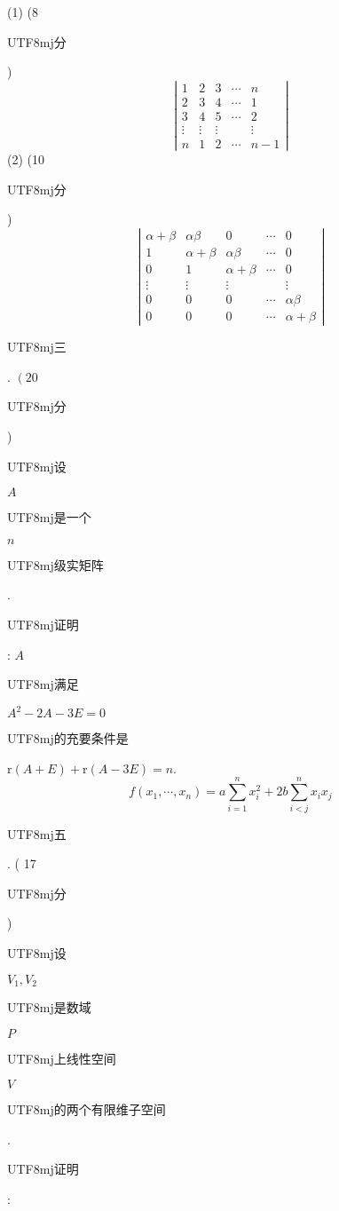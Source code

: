 \documentclass[10pt]{article}
\begin{document}
(1) (8 \begin{CJK}{UTF8}{mj}分\end{CJK})
$$
\left|\begin{array}{ccccc}
1 & 2 & 3 & \cdots & n \\
2 & 3 & 4 & \cdots & 1 \\
3 & 4 & 5 & \cdots & 2 \\
\vdots & \vdots & \vdots & & \vdots \\
n & 1 & 2 & \cdots & n-1
\end{array}\right|
$$
(2) (10 \begin{CJK}{UTF8}{mj}分\end{CJK})
$$
\left|\begin{array}{ccccc}
\alpha+\beta & \alpha \beta & 0 & \cdots & 0 \\
1 & \alpha+\beta & \alpha \beta & \cdots & 0 \\
0 & 1 & \alpha+\beta & \cdots & 0 \\
\vdots & \vdots & \vdots & & \vdots \\
0 & 0 & 0 & \cdots & \alpha \beta \\
0 & 0 & 0 & \cdots & \alpha+\beta
\end{array}\right|
$$
\begin{CJK}{UTF8}{mj}三\end{CJK}. $\left(20\right.$ \begin{CJK}{UTF8}{mj}分\end{CJK}) \begin{CJK}{UTF8}{mj}设\end{CJK} $A$ \begin{CJK}{UTF8}{mj}是一个\end{CJK} $n$ \begin{CJK}{UTF8}{mj}级实矩阵\end{CJK}. \begin{CJK}{UTF8}{mj}证明\end{CJK}: $A$ \begin{CJK}{UTF8}{mj}满足\end{CJK} $A^{2}-2 A-3 E=0$ \begin{CJK}{UTF8}{mj}的充要条件是\end{CJK} $\mathrm{r}(A+E)+\mathrm{r}(A-3 E)=n$.
$$
f\left(x_{1}, \cdots, x_{n}\right)=a \sum_{i=1}^{n} x_{i}^{2}+2 b \sum_{i<j}^{n} x_{i} x_{j}
$$
\begin{CJK}{UTF8}{mj}五\end{CJK}. ( 17 \begin{CJK}{UTF8}{mj}分\end{CJK}) \begin{CJK}{UTF8}{mj}设\end{CJK} $V_{1}, V_{2}$ \begin{CJK}{UTF8}{mj}是数域\end{CJK} $P$ \begin{CJK}{UTF8}{mj}上线性空间\end{CJK} $V$ \begin{CJK}{UTF8}{mj}的两个有限维子空间\end{CJK}. \begin{CJK}{UTF8}{mj}证明\end{CJK}:
\end{document}
